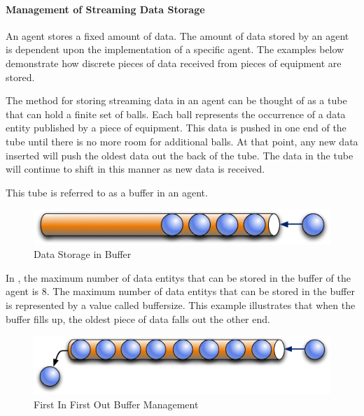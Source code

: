 \documentclass{mtconnect}	%
\begin{document}
\paragraph{Management of Streaming Data Storage}\mbox{}
\label{sec:Management of Streaming Data Storage}

An \gls{agent} stores a fixed amount of data.  The amount of data stored by an \gls{agent} is dependent upon the implementation of a specific \gls{agent}.  The examples below demonstrate how discrete pieces of data received from pieces of equipment are stored.

The method for storing \gls{streaming data} in an \gls{agent} can be thought of as a tube that can hold a finite set of balls.  Each ball represents the occurrence of a \gls{data entity} published by a piece of equipment.  This data is pushed in one end of the tube until there is no more room for additional balls.  At that point, any new data inserted will push the oldest data out the back of the tube.  The data in the tube will continue to shift in this manner as new data is received.

This tube is referred to as a \gls{buffer} in an \gls{agent}.

\begin{figure}[ht]
  \centering
  \includegraphics[width=1.0\textwidth]{figures/data-storage-in-buffer.png}
  \caption{Data Storage in Buffer}
  \label{fig:data-storage-in-buffer}
\end{figure}

\FloatBarrier

In , the maximum number of \glspl{data entity} that can be stored in the \gls{buffer} of the \gls{agent} is 8.  The maximum number of \glspl{data entity} that can be stored in the \gls{buffer} is represented by a value called \gls{buffersize}.  This example illustrates that when the \gls{buffer} fills up, the oldest piece of data falls out the other end.

\begin{figure}[ht]
  \centering
  \includegraphics[width=1.0\textwidth]{figures/first-in-first-out-buffer-management.png}
  \caption{First In First Out Buffer Management}
  \label{fig:first-in-first-out-buffer-management}
\end{figure}
\end{document}
